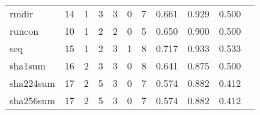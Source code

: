 \begin{longtable}{lp{1.2cm}p{1.2cm}p{1.2cm}p{1.2cm}p{1.2cm}p{1.2cm}p{1.2cm}p{1.2cm}p{1.2cm}p{1.2cm}}
rmdir     &                                    14 &                                                  1 &                                                  3 &                                                  3 &                                                  0 &                                                  7 &                                              0.661 &                                              0.929 &                                              0.500 \\
runcon    &                                    10 &                                                  1 &                                                  2 &                                                  2 &                                                  0 &                                                  5 &                                              0.650 &                                              0.900 &                                              0.500 \\
seq       &                                    15 &                                                  1 &                                                  2 &                                                  3 &                                                  1 &                                                  8 &                                              0.717 &                                              0.933 &                                              0.533 \\
sha1sum   &                                    16 &                                                  2 &                                                  3 &                                                  3 &                                                  0 &                                                  8 &                                              0.641 &                                              0.875 &                                              0.500 \\
sha224sum &                                    17 &                                                  2 &                                                  5 &                                                  3 &                                                  0 &                                                  7 &                                              0.574 &                                              0.882 &                                              0.412 \\
sha256sum &                                    17 &                                                  2 &                                                  5 &                                                  3 &                                                  0 &                                                  7 &                                              0.574 &                                              0.882 &                                              0.412 \\

\end{longtable}
